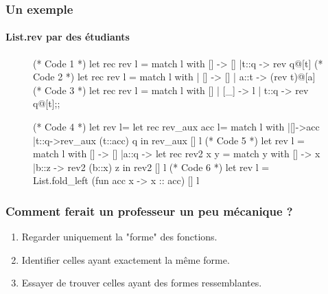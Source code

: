 \documentclass[11pt]{beamer}
\newenvironment{tinyocaml}
{\small\VerbatimEnvironment
	\begin{mytinyocaml}}
	{\end{mytinyocaml}}
\begin{document}
\begin{frame}[fragile]
	\frametitle{Un exemple}
	\framesubtitle{List.rev par des étudiants}

\begin{figure}
\begin{multicols}{2}
\begin{tinyocaml}
(* Code 1 *)
let rec rev l = match l with
  [] -> []
  |t::q -> rev q@[t]
(* Code 2 *)
let rec rev l = match l with
  | [] -> []
  | a::t -> (rev t)@[a]
(* Code 3 *)
let rec rev l = match l with
  [] | [_] -> l
  | t::q -> rev q@[t];;
\end{tinyocaml}
\begin{tinyocaml}
(* Code 4 *)
let rev l=
  let rec rev_aux acc l=
    match l with
    |[]->acc
    |t::q->rev_aux (t::acc) q
  in rev_aux [] l
(* Code 5 *)
let rev l = match l with
  [] -> []
  |a::q ->
    let rec rev2 x y = match y with
    [] -> x
    |b::z -> rev2 (b::x) z in rev2 [] l
(* Code 6 *)
let rev l =
  List.fold_left
    (fun acc x -> x :: acc) [] l
\end{tinyocaml}
\end{multicols}
\end{figure}
\end{frame}

\begin{frame}
	\frametitle{Comment ferait un professeur un peu mécanique ?}
\begin{enumerate}
\item Regarder uniquement la "forme" des fonctions.
\item Identifier celles ayant exactement la même forme.
\item Essayer de trouver celles ayant des formes ressemblantes.
\end{enumerate}
\end{frame}
\end{document}
